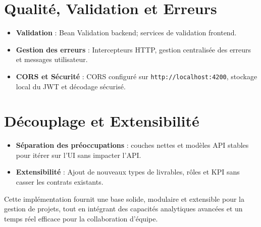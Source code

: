 \section{Qualité, Validation et Erreurs}
\begin{itemize}
  \item \textbf{Validation} : Bean Validation backend; services de validation frontend.
  \item \textbf{Gestion des erreurs} : Intercepteurs HTTP, gestion centralisée des erreurs et messages utilisateur.
  \item \textbf{CORS et Sécurité} : CORS configuré sur \texttt{http://localhost:4200}, stockage local du JWT et décodage sécurisé.
\end{itemize}

\section{Découplage et Extensibilité}
\begin{itemize}
  \item \textbf{Séparation des préoccupations} : couches nettes et modèles API stables pour itérer sur l’UI sans impacter l’API.
  \item \textbf{Extensibilité} : Ajout de nouveaux types de livrables, rôles et KPI sans casser les contrats existants.
\end{itemize}

Cette implémentation fournit une base solide, modulaire et extensible pour la gestion de projets, tout en intégrant des capacités analytiques avancées et un temps réel efficace pour la collaboration d'équipe. 